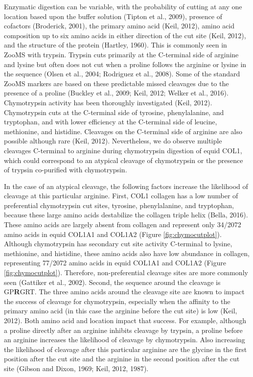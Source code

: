 \documentclass[preprint, 3p, authoryear]{elsarticle} %
\begin{document}
Enzymatic digestion can be variable, with the probability of cutting at any one location based upon the buffer solution (Tipton et al., 2009), presence of cofactors (Broderick, 2001), the primary amino acid (Keil, 2012), amino acid composition up to six amino acids in either direction of the cut site (Keil, 2012), and the structure of the protein (Hartley, 1960). This is commonly seen in ZooMS with trypsin. Trypsin cuts primarily at the C-terminal side of arginine and lysine but often does not cut when a proline follows the arginine or lysine in the sequence (Olsen et al., 2004; Rodriguez et al., 2008). Some of the standard ZooMS markers are based on these predictable missed cleavages due to the presence of a proline (Buckley et al., 2009; Keil, 2012; Welker et al., 2016). Chymotrypsin activity has been thoroughly investigated (Keil, 2012). Chymotrypsin cuts at the C-terminal side of tyrosine, phenylalanine, and tryptophan, and with lower efficiency at the C-terminal side of leucine, methionine, and histidine. Cleavages on the C-terminal side of arginine are also possible although rare (Keil, 2012). Nevertheless, we do observe multiple cleavages C-terminal to arginine during chymotrypsin digestion of equid COL1, which could correspond to an atypical cleavage of chymotrypsin or the presence of trypsin co-purified with chymotrypsin.

In the case of an atypical cleavage, the following factors increase the likelihood of cleavage at this particular arginine. First, COL1 collagen has a low number of preferential chymotrypsin cut sites, tyrosine, phenylalanine, and tryptophan, because these large amino acids destabilize the collagen triple helix (Bella, 2016). These amino acids are largely absent from collagen and represent only 34/2072 amino acids in equid COL1A1 and COL1A2 (Figure \ref{fig:chymocutplot}). Although chymotrypsin has secondary cut site activity C-terminal to lysine, methionine, and histidine, these amino acids also have low abundance in collagen, representing 77/2072 amino acids in equid COL1A1 and COL1A2 (Figure \ref{fig:chymocutplot}). Therefore, non-preferential cleavage sites are more commonly seen (Gattiker et al., 2002). Second, the sequence around the cleavage is GP\textbf{R}GRT. The three amino acids around the cleavage site are known to impact the success of cleavage for chymotrypsin, especially when the affinity to the primary amino acid (in this case the arginine before the cut site) is low (Keil, 2012). Both amino acid and location impact that success. For example, although a proline directly after an arginine inhibits cleavage by trypsin, a proline before an arginine increases the likelihood of cleavage by chymotrypsin. Also increasing the likelihood of cleavage after this particular arginine are the glycine in the first position after the cut site and the arginine in the second position after the cut site (Gibson and Dixon, 1969; Keil, 2012, 1987).
\end{document}

